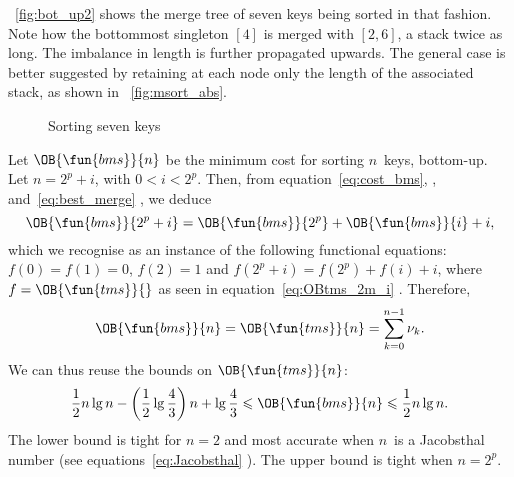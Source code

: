 \Fig~\vref{fig:bot_up2} shows the merge tree
of seven keys being sorted in that fashion. Note how the bottommost
singleton \([4]\) is merged with \([2,6]\), a stack twice as long. The
imbalance in length is further propagated upwards. The general case is
better suggested by retaining at each node only the length of the
associated stack, as shown in \fig~\vref{fig:msort_abs}.
\begin{figure}[!b]
\centering
{}
\qquad
{}
\caption{Sorting seven keys}
\end{figure}


Let \(\OB{\fun{bms}}{n}\) be the
minimum cost for sorting \(n\)~keys, bottom\hyp{}up. Let \(n=2^p+i\),
with \(0 < i < 2^p\). Then, from equation~\eqref{eq:cost_bms},
, and~\eqref{eq:best_merge}
, we deduce
\begin{equation*}
\OB{\fun{bms}}{2^p+i} = \OB{\fun{bms}}{2^p} + \OB{\fun{bms}}{i} + i,
\end{equation*}
which we recognise as an instance of the following functional
equations: \(f(0)=f(1)=0\), \(f(2)=1\) and \(f(2^p+i) = f(2^p) + f(i)
+ i\), where \(f=\OB{\fun{tms}}{}\) as seen in
equation~\eqref{eq:OBtms_2m_i} . Therefore,
\begin{equation}
\OB{\fun{bms}}{n} = \OB{\fun{tms}}{n} = \sum_{k=0}^{n-1}{\nu_k}.
\label{eq:OBbms}
\end{equation}
We can thus reuse the bounds on \(\OB{\fun{tms}}{n}\):
\begin{equation}
\frac{1}{2}n\lg n - \left(\frac{1}{2}\lg\frac{4}{3}\right)n + \lg\frac{4}{3}
\leqslant \OB{\fun{bms}}{n} \leqslant
\frac{1}{2}n\lg n.
\index{bms@$\OB{\fun{bms}}{n}$}
\end{equation}
The lower bound is tight for \(n=2\) and most accurate when \(n\)~is a
Jacobsthal number (see
equations~\eqref{eq:Jacobsthal} ). The upper
bound is tight when \(n=2^p\).


